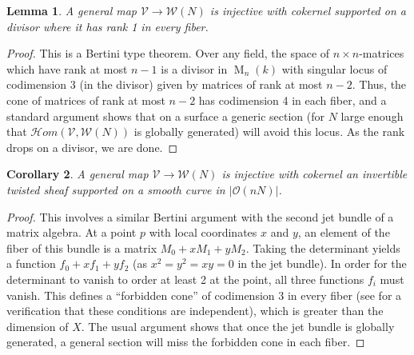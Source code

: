 \documentclass[11pt]{amsart}
\newcommand{\ms}[1]{\mathscr #1}
\newcommand{\shom}{\ms H\!om}
\renewcommand{\[}{[\!\hspace{0.03em}[}
\renewcommand{\]}{]\!\hspace{0.03em}]}
\renewcommand{\(}{(\!\hspace{0.03em}(}
\renewcommand{\)}{)\!\hspace{0.03em})}
\DeclareMathOperator{\M}{\operatorname{M}}
\newtheorem{lem}{Lemma}[subsubsection]%
\newtheorem{cor}[lem]{Corollary}
\theoremstyle{definition}
\theoremstyle{remark}
\begin{document}
\begin{lem} A general map $\ms V\to\ms W(N)$ is injective with 
cokernel supported on a divisor where it has rank 1 in every fiber.
\end{lem}
\begin{proof} This is a Bertini type theorem.  Over any field, the space of $n\times 
n$-matrices which have rank at most $n-1$ is a divisor in $\M_{n}(k)$ 
with singular locus of codimension $3$ (in the divisor) given by 
matrices of rank at most $n-2$.  Thus, the cone of matrices of rank at 
most $n-2$ has codimension 4 in each fiber, and a standard  
argument shows that on a surface a generic section (for $N$ large 
enough that $\shom(\ms V,\ms W(N))$ is globally generated) will avoid 
this locus.  As the rank drops on a divisor, we are done.
\end{proof}
\begin{cor} A general map $\ms V\to\ms W(N)$ is injective with 
cokernel an invertible twisted sheaf supported on a \emph{smooth\/} curve in 
$|{\ms O}(nN)|$.
\end{cor}
\begin{proof} This involves a similar Bertini argument with the second jet 
bundle of a matrix algebra.  At a point $p$ with local coordinates 
$x$ and $y$, an element of the fiber of this bundle is a matrix 
$M_{0}+xM_{1}+yM_{2}$.  Taking the determinant yields a function 
$f_{0}+xf_{1}+yf_{2}$ (as $x^{2}=y^{2}=xy=0$ in the jet bundle).  In 
order for the determinant to vanish to order at least 2 at the point, 
all three functions $f_{i}$ must vanish.  This defines a ``forbidden 
cone'' of codimension 3 in every fiber (see \cite[8.1.1.6]{artin-dejong} for a 
verification that these conditions are independent), which is greater than the 
dimension of $X$.  The usual argument shows that once the jet bundle 
is globally generated, a general section will miss the forbidden cone 
in each fiber.
\end{proof}
\end{document}
